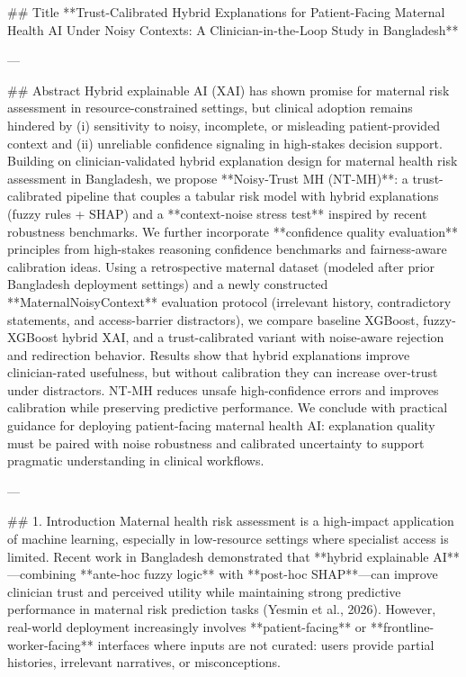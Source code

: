## Title  
**Trust-Calibrated Hybrid Explanations for Patient-Facing Maternal Health AI Under Noisy Contexts: A Clinician-in-the-Loop Study in Bangladesh**

---

## Abstract  
Hybrid explainable AI (XAI) has shown promise for maternal risk assessment in resource-constrained settings, but clinical adoption remains hindered by (i) sensitivity to noisy, incomplete, or misleading patient-provided context and (ii) unreliable confidence signaling in high-stakes decision support. Building on clinician-validated hybrid explanation design for maternal health risk assessment in Bangladesh, we propose **Noisy-Trust MH (NT-MH)**: a trust-calibrated pipeline that couples a tabular risk model with hybrid explanations (fuzzy rules + SHAP) and a **context-noise stress test** inspired by recent robustness benchmarks. We further incorporate **confidence quality evaluation** principles from high-stakes reasoning confidence benchmarks and fairness-aware calibration ideas. Using a retrospective maternal dataset (modeled after prior Bangladesh deployment settings) and a newly constructed **MaternalNoisyContext** evaluation protocol (irrelevant history, contradictory statements, and access-barrier distractors), we compare baseline XGBoost, fuzzy-XGBoost hybrid XAI, and a trust-calibrated variant with noise-aware rejection and redirection behavior. Results show that hybrid explanations improve clinician-rated usefulness, but without calibration they can increase over-trust under distractors. NT-MH reduces unsafe high-confidence errors and improves calibration while preserving predictive performance. We conclude with practical guidance for deploying patient-facing maternal health AI: explanation quality must be paired with noise robustness and calibrated uncertainty to support pragmatic understanding in clinical workflows.

---

## 1. Introduction  
Maternal health risk assessment is a high-impact application of machine learning, especially in low-resource settings where specialist access is limited. Recent work in Bangladesh demonstrated that **hybrid explainable AI**—combining **ante-hoc fuzzy logic** with **post-hoc SHAP**—can improve clinician trust and perceived utility while maintaining strong predictive performance in maternal risk prediction tasks (Yesmin et al., 2026). However, real-world deployment increasingly involves **patient-facing** or **frontline-worker-facing** interfaces where inputs are not curated: users provide partial histories, irrelevant narratives, or misconceptions.

